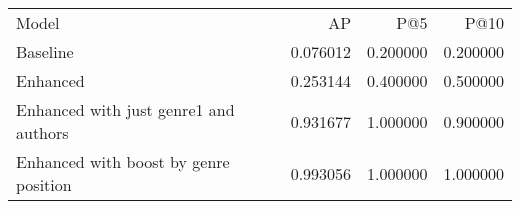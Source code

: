 \begin{tabular}{lrrr}
Model & AP & P@5 & P@10 \\
Baseline & 0.076012 & 0.200000 & 0.200000 \\
Enhanced & 0.253144 & 0.400000 & 0.500000 \\
Enhanced with just genre1 and authors & 0.931677 & 1.000000 & 0.900000 \\
Enhanced with boost by genre position & 0.993056 & 1.000000 & 1.000000 \\
\end{tabular}
